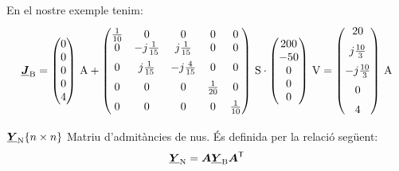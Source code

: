 \begin{list}{}
   En el nostre exemple tenim:
   \[
      \mcmplx{J}\ped{B} =
      \begin{pmatrix} 0 \\ 0 \\ 0 \\ 0 \\ 4 \end{pmatrix}\,\unit{A} +
       \begin{pmatrix}
            \frac{1}{10} & 0 & 0 & 0 & 0 \\
            0 & -j\frac{1}{15} & j\frac{1}{15} & 0 & 0 \\[2mm]
            0 & j\frac{1}{15} & -j\frac{4}{15} & 0 & 0 \\[2mm]
            0 & 0 & 0 & \frac{1}{20} & 0 \\[2mm]
            0 & 0 & 0 & 0 & \frac{1}{10}
      \end{pmatrix}\,\unit{S} \cdot
      \begin{pmatrix} 200 \\ -50 \\ 0 \\ 0 \\ 0 \end{pmatrix}\,\unit{V} =
      \begin{pmatrix}
            20 \\[2mm]
             j \frac{10}{3} \\[2mm]
             -j \frac{10}{3} \\[2mm]
             0 \\[2mm]
              4
      \end{pmatrix}\,\unit{A}
   \]

   \item[$\underline{\boldsymbol{Y}}_\mathrm{N}\{n\times n\}$] Matriu d'admitàncies de nus. És definida per la relació següent:
   \begin{equation}
      \underline{\boldsymbol{Y}}_\mathrm{N} = \boldsymbol{A} \underline{\boldsymbol{Y}}_\mathrm{B}
      \boldsymbol{A}^\mathrm{\textsf{T}}
   \end{equation}


\end{list}
